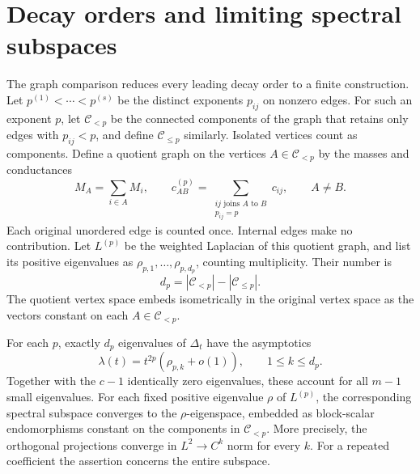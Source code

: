 \section{Decay orders and limiting spectral subspaces}\label{sec:orders}

The graph comparison reduces every leading decay order to a finite
construction. Let $p^{(1)}<\cdots<p^{(s)}$ be the distinct exponents
$p_{ij}$ on nonzero edges. For such an exponent $p$, let
$\mathcal C_{<p}$ be the connected components of the graph that
retains only edges with $p_{ij}<p$, and define
$\mathcal C_{\le p}$ similarly. Isolated vertices count as
components. Define a quotient graph on the vertices
$A\in\mathcal C_{<p}$ by the masses and conductances
\begin{equation}\label{eq:quotient-data}
 M_A=\sum_{i\in A}M_i,\qquad
 c^{(p)}_{AB}
 =\sum_{\substack{ij\text{ joins }A\text{ to }B\\p_{ij}=p}}c_{ij},
 \qquad A\ne B.
\end{equation}
Each original unordered edge is counted once. Internal edges make no
contribution. Let $L^{(p)}$ be the weighted Laplacian of this
quotient graph, and list its positive eigenvalues as
$\rho_{p,1},\ldots,\rho_{p,d_p}$, counting multiplicity.
Their number is
\[
 d_p=|\mathcal C_{<p}|-|\mathcal C_{\le p}|.
\]
The quotient vertex space embeds isometrically in the original vertex
space as the vectors constant on each $A\in\mathcal C_{<p}$.

\begin{theorem}\label{thm:orders}
For each $p$, exactly $d_p$ eigenvalues of $\Delta_t$ have
the asymptotics
\begin{equation}\label{eq:all-orders}
 \lambda(t)=t^{2p}(\rho_{p,k}+o(1)),
 \qquad 1\le k\le d_p.
\end{equation}
Together with the $c-1$ identically zero eigenvalues, these account for
all $m-1$ small eigenvalues. For each fixed positive eigenvalue $\rho$
of $L^{(p)}$, the corresponding spectral subspace converges to
the $\rho$-eigenspace, embedded as block-scalar endomorphisms constant
on the components in $\mathcal C_{<p}$. More precisely, the
orthogonal projections converge in $L^2\to C^k$ norm for every $k$.
For a repeated coefficient the assertion concerns the entire subspace.
\end{theorem}

